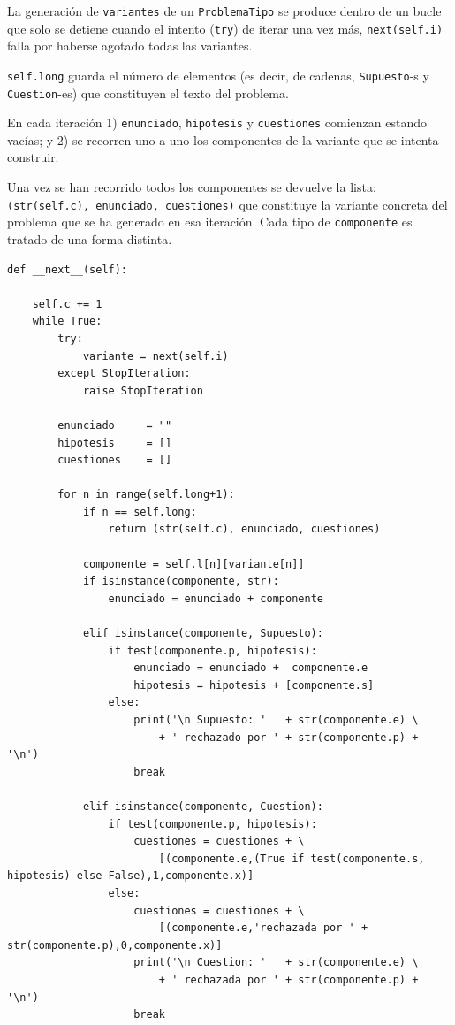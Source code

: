 \documentclass[10pt,a4paper]{report}
\begin{document}
La generación de \texttt{variantes} de un \texttt{ProblemaTipo} se produce dentro de un bucle que solo se detiene cuando el intento (\texttt{try}) de iterar una vez más, \texttt{next(self.i)} falla por haberse agotado todas las variantes.

\texttt{self.long} guarda el número de elementos (es decir, de cadenas, \texttt{Supuesto}-s y \texttt{Cuestion}-es) que constituyen el texto del problema.

En cada iteración 1) \texttt{enunciado}, \texttt{hipotesis} y \texttt{cuestiones} comienzan estando vacías; y 2) se recorren uno a uno los componentes de la variante que se intenta construir.

Una vez se han recorrido todos los componentes se devuelve la lista:
\texttt{(str(self.c), enunciado, cuestiones)} que constituye la variante concreta del problema que se ha generado en esa iteración.
Cada tipo de \texttt{componente} es tratado de una forma distinta.

\begin{verbatim}
def __next__(self):

    self.c += 1
    while True:
        try:
            variante = next(self.i)
        except StopIteration:
            raise StopIteration

        enunciado     = ""
        hipotesis     = []
        cuestiones    = []

        for n in range(self.long+1):
            if n == self.long:
                return (str(self.c), enunciado, cuestiones)

            componente = self.l[n][variante[n]]
            if isinstance(componente, str):
                enunciado = enunciado + componente
            
            elif isinstance(componente, Supuesto):
                if test(componente.p, hipotesis):
                    enunciado = enunciado +  componente.e
                    hipotesis = hipotesis + [componente.s]
                else:
                    print('\n Supuesto: '   + str(componente.e) \
                        + ' rechazado por ' + str(componente.p) + '\n')
                    break
            
            elif isinstance(componente, Cuestion):
                if test(componente.p, hipotesis):
                    cuestiones = cuestiones + \
                        [(componente.e,(True if test(componente.s, hipotesis) else False),1,componente.x)]
                else:
                    cuestiones = cuestiones + \
                        [(componente.e,'rechazada por ' + str(componente.p),0,componente.x)]
                    print('\n Cuestion: '   + str(componente.e) \
                        + ' rechazada por ' + str(componente.p) + '\n')
                    break
\end{verbatim}
\end{document}
